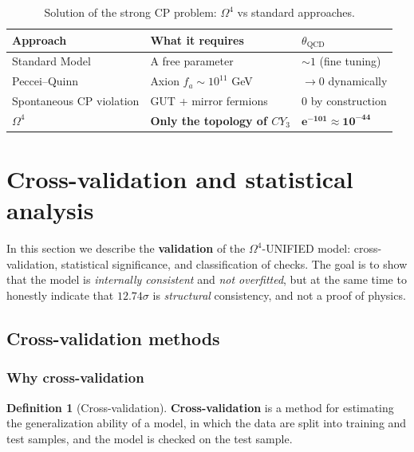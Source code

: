 \documentclass[11pt,a4paper]{article}
\newcommand{\CY}{\ensuremath{CY_3}}
\newcommand{\Om}{\ensuremath{\Omega^4}}
\theoremstyle{definition}
\newtheorem{definition}[theorem]{Definition}
\begin{document}
\begin{table}[htbp]
\centering
\caption{Solution of the strong CP problem: \texorpdfstring{$\Om$}{} vs standard approaches.}
\label{tab:strong-cp-comparison}
\begin{tabular}{p{3cm}p{4cm}p{4cm}}
\toprule
Approach & What it requires & $\theta_{\text{QCD}}$ \\
\midrule
Standard Model & A free parameter & $\sim 1$ (fine tuning) \\
Peccei--Quinn & Axion $f_a \sim 10^{11}$ GeV & $\to 0$ dynamically \\
Spontaneous CP violation & GUT + mirror fermions & $0$ by construction \\
\textbf{$\Om$} & \textbf{Only the topology of $\CY$} & $\boldsymbol{e^{-101} \approx 10^{-44}}$ \\
\bottomrule
\end{tabular}
\end{table}
\section{Cross-validation and statistical analysis}
\label{sec:validation}

In this section we describe the \textbf{validation} of the $\Om$-UNIFIED model:
cross-validation, statistical significance, and classification of checks.
The goal is to show that the model is \emph{internally consistent}
and \emph{not overfitted}, but at the same time to honestly indicate that
$12.74\sigma$ is \emph{structural} consistency,
and not a proof of physics.

\subsection{Cross-validation methods}
\label{subsec:cv-methods}

\subsubsection{Why cross-validation}

\begin{definition}[Cross-validation]
\label{def:cross-validation}
\textbf{Cross-validation} is a method for estimating the generalization ability
of a model, in which the data are split into training and test
samples, and the model is checked on the test sample.
\end{definition}
\end{document}

